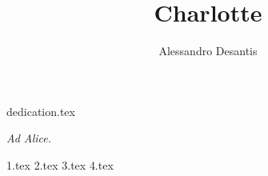 \documentclass[a4paper,oneside,11pt]{memoir}
\title{Charlotte}
\author{Alessandro Desantis}
\date{}
\begin{document}
    \begin{titlingpage}
        \maketitle
    \end{titlingpage}

    {dedication.tex}
    \begin{dedicationpage}
        \emph{Ad Alice.}
    \end{dedicationpage}


    {1.tex}
    {2.tex}
    {3.tex}
    {4.tex}
\end{document}
